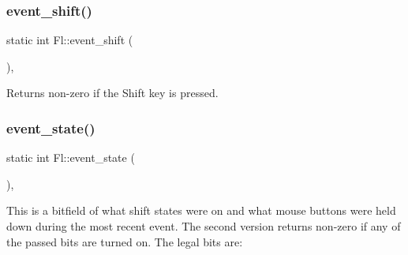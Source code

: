 \subsubsection{\texorpdfstring{event\+\_\+shift()}{event\_shift()}}
{\footnotesize\ttfamily static int Fl\+::event\+\_\+shift (\begin{DoxyParamCaption}{ }\end{DoxyParamCaption})\hspace{0.3cm}{\ttfamily [inline]}, {\ttfamily [static]}}

Returns non-\/zero if the Shift key is pressed. \mbox{\label{group__fl__events_gafa17a5b4d8d9163631c88142e60447ed}} 
\subsubsection{\texorpdfstring{event\+\_\+state()}{event\_state()}\hspace{0.1cm}{\footnotesize\ttfamily [1/2]}}
{\footnotesize\ttfamily static int Fl\+::event\+\_\+state (\begin{DoxyParamCaption}{ }\end{DoxyParamCaption})\hspace{0.3cm}{\ttfamily [inline]}, {\ttfamily [static]}}

This is a bitfield of what shift states were on and what mouse buttons were held down during the most recent event. The second version returns non-\/zero if any of the passed bits are turned on. The legal bits are\+:

